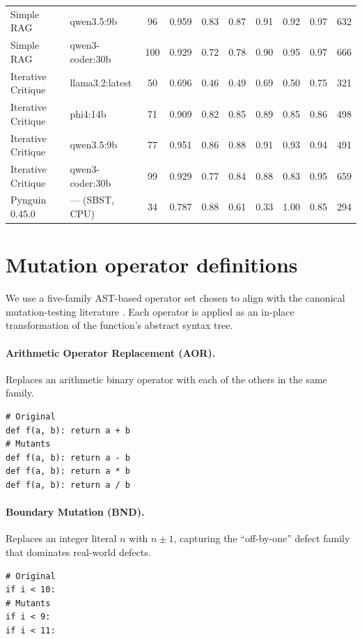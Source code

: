 \documentclass[smallextended]{svjour3}
\begin{document}
\begin{table}[htbp]
\begin{tabular}{@{}llcccccccc@{}}
Simple RAG & qwen3.5:9b & 96 & 0.959 & 0.83 & 0.87 & 0.91 & 0.92 & 0.97 & 632 \\
Simple RAG & qwen3-coder:30b & 100 & 0.929 & 0.72 & 0.78 & 0.90 & 0.95 & 0.97 & 666 \\
\midrule
Iterative Critique & llama3.2:latest & 50 & 0.696 & 0.46 & 0.49 & 0.69 & 0.50 & 0.75 & 321 \\
Iterative Critique & phi4:14b & 71 & 0.909 & 0.82 & 0.85 & 0.89 & 0.85 & 0.86 & 498 \\
Iterative Critique & qwen3.5:9b & 77 & 0.951 & 0.86 & 0.88 & 0.91 & 0.93 & 0.94 & 491 \\
Iterative Critique & qwen3-coder:30b & 99 & 0.929 & 0.77 & 0.84 & 0.88 & 0.83 & 0.95 & 659 \\
\midrule
Pynguin 0.45.0 & --- (SBST, CPU) & 34 & 0.787 & 0.88 & 0.61 & 0.33 & 1.00 & 0.85 & 294 \\
\bottomrule
\end{tabular}

\vspace{0.5em}
\raggedright \scriptsize
\end{table}

\section{Mutation operator definitions}\label{app:operators}

We use a five-family AST-based operator set chosen to align
with the canonical mutation-testing literature
\citep{just2014,andrews2005,papadakis2019survey}. Each operator is
applied as an in-place transformation of the function's
abstract syntax tree.

\paragraph{Arithmetic Operator Replacement (AOR).}
Replaces an arithmetic binary operator with each of the others
in the same family.
\begin{verbatim}
# Original
def f(a, b): return a + b
# Mutants
def f(a, b): return a - b
def f(a, b): return a * b
def f(a, b): return a / b
\end{verbatim}

\paragraph{Boundary Mutation (BND).}
Replaces an integer literal $n$ with $n \pm 1$, capturing the
``off-by-one'' defect family that dominates real-world
defects.
\begin{verbatim}
# Original
if i < 10:
# Mutants
if i < 9:
if i < 11:
\end{verbatim}
\end{document}
